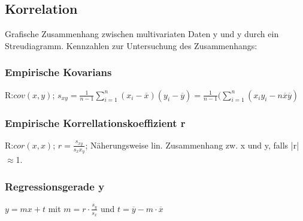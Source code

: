       \subsection{Korrelation}
      Grafische Zusammenhang zwischen multivariaten Daten y und y durch ein Streudiagramm. Kennzahlen zur Untersuchung des Zusammenhangs:
      \subsubsection{Empirische Kovarians}
      R:$cov(x,y)$;
      $s_{xy} = \frac{1}{n-1}\sum_{i=1}^{n}(x_{i}-\overline{x})(y_{i}-\overline{y})=\frac{1}{n-1}(\sum_{i=1}^{n}(x_{i}y_{i}- n\overline{x}\overline{y})$
      \subsubsection{Empirische Korrellationskoeffizient r}
      R:$cor(x,x)$;
      $r = \frac{s_{xy}}{s_{x}x_{y}}$; Näherungsweise lin. Zusammenhang zw. x und y, falls |r| $\approx$1.
      \subsubsection{Regressionsgerade y}
      $y = mx + t$ mit $m=r \cdot \frac{s_{y}}{s_{x}}$ und $ t=\overline{y} -m \cdot \overline{x}$